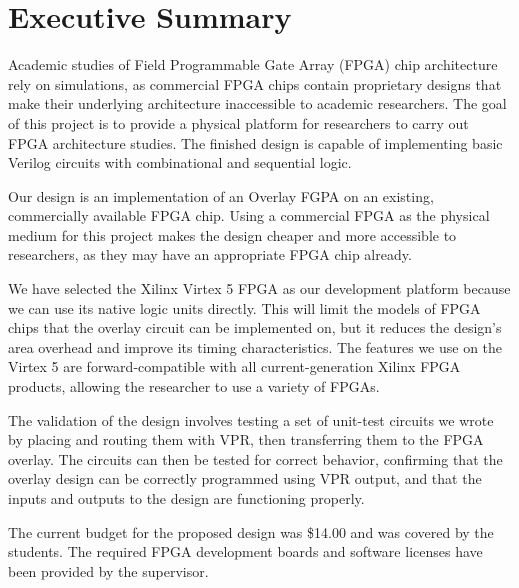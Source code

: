 \thispagestyle{empty}
\section*{Executive Summary}


Academic studies of Field Programmable Gate Array (FPGA) chip architecture rely on simulations, as commercial FPGA chips contain proprietary designs that make their underlying architecture inaccessible to academic researchers.
The goal of this project is to provide a physical platform for researchers to carry out FPGA architecture studies.
The finished design is capable of implementing basic Verilog circuits with combinational and sequential logic.

Our design is an implementation of an Overlay FGPA on an existing, commercially available FPGA chip.
Using a commercial FPGA as the physical medium for this project makes the design cheaper and more accessible to researchers, as they may have an appropriate FPGA chip already.


We have selected the Xilinx Virtex 5 FPGA as our development platform because we can use its native logic units directly.
This will limit the models of FPGA chips that the overlay circuit can be implemented on, but it reduces the design's area overhead and improve its timing characteristics.
The features we use on the Virtex 5 are forward-compatible with all current-generation Xilinx FPGA products, allowing the researcher to use a variety of FPGAs.

The validation of the design involves testing a set of unit-test circuits we wrote by placing and routing them with VPR, then transferring them to the FPGA overlay.
The circuits can then be tested for correct behavior, confirming that the overlay design can be correctly programmed using VPR output, and that the inputs and outputs to the design are functioning properly.

The current budget for the proposed design was \$14.00 and was covered by the students.
The required FPGA development boards and software licenses have been provided by the supervisor.

